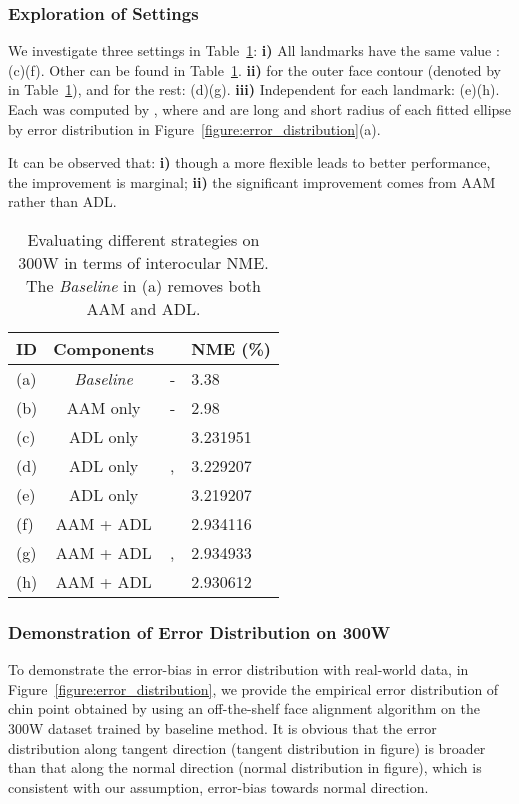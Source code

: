 \documentclass[10pt,twocolumn,letterpaper]{article}
\begin{document}
\subsubsection{Exploration of  Settings}

We investigate three  settings in Table~\ref{table:diff_lambda}:
\textbf{i)} All landmarks have the same value : (c)(f). 
Other  can be found in Table~\ref{table:diff_lambda}.
\textbf{ii)}  for the outer face contour (denoted by  in Table~\ref{table:diff_lambda}), and  for the rest: (d)(g).
\textbf{iii)} Independent  for each landmark: (e)(h).
Each was computed by , where  and  are long and short radius of each fitted ellipse by error distribution in Figure~\ref{figure:error_distribution}(a).

It can be observed that: 
\textbf{i)} though a more flexible  leads to better performance, the improvement is marginal; 
\textbf{ii)} the significant improvement comes from AAM rather than ADL.

\begin{table}[ht]
\footnotesize
\begin{center}
\begin{tabular}{l|c|l|l}
\hline
ID & Components &  & NME (\%) \\
\hline
(a) & \emph{Baseline} & - & 3.38 \\
(b) & AAM only & - & 2.98 \\
\hline
(c) & ADL only &  & 3.231951 \\
(d) & ADL only & ,  & 3.229207 \\
(e) & ADL only &  & 3.219207 \\
\hline
(f) & AAM + ADL &  & 2.934116 \\
(g) & AAM + ADL & ,  & 2.934933 \\
(h) & AAM + ADL &  & 2.930612 \\
\hline
\end{tabular}
\vspace{-2mm}
\end{center}
\caption{Evaluating different  strategies on 300W in terms of interocular NME. The \emph{Baseline} in (a) removes both AAM and ADL.}
\label{table:diff_lambda}
\vspace{-5mm}
\end{table}


\subsubsection{Demonstration of Error Distribution on 300W}
To demonstrate the error-bias in error distribution with real-world data, in Figure~\ref{figure:error_distribution}, we provide the empirical error distribution of chin point obtained by using an off-the-shelf face alignment algorithm on the 300W dataset trained by baseline method.
It is obvious that the error distribution along tangent direction (tangent distribution in figure) is broader than that along the normal direction (normal distribution in figure), which is consistent with our assumption, error-bias towards normal direction.
\end{document}
